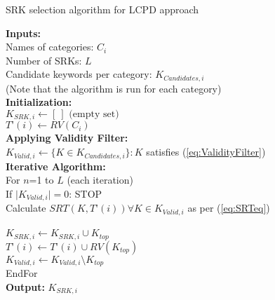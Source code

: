 \begin{algorithm}
\fontsize{8pt}{1em}\selectfont
\caption{SRK selection algorithm for LCPD approach}
\label{SRTAlgorithm}
\textbf{Inputs:} \\ 
\hspace*{2mm} Names of categories: $C_i$ \\
\hspace*{2mm} Number of SRKs: $L$ \\
\hspace*{2mm} Candidate keywords per category: $K_{Candidates, i}$\\
\hspace*{2mm}   (Note that the algorithm is run for each category) \\ 
\textbf{Initialization:} \\ 
\hspace*{2mm} $K_{SRK, i} \leftarrow  [ \ ] \text{~(empty set)}$ \\
\hspace*{2mm} $T\text{'}(i) \leftarrow  RV(C_i)$ \\
\textbf{Applying Validity Filter:} \\
\hspace*{2mm} $K_{Valid,i} \leftarrow \{K \in K_{Candidates, i} \}: K$ satisfies (\ref{eq:ValidityFilter}) \\
\textbf{Iterative Algorithm:} \\
\hspace*{2mm} For $n$=1 to $L$ (each iteration) \\
\hspace*{6mm}  If $\mid K_{Valid, i}\mid=0$: STOP \\ 
\hspace*{6mm}  Calculate $SRT(K,T\text{'}(i)) \forall K \in K_{Valid, i}$ as per (\ref{eq:SRTeq})  \\
\hspace*{6mm}   \\
\hspace*{6mm}  $K_{SRK, i} \leftarrow K_{SRK, i} \cup K_{top}$ \\ 
\hspace*{6mm}  $T\text{'}(i) \leftarrow  T\text{'}(i) \cup RV(K_{top})$ \\
\hspace*{6mm}  $K_{Valid, i} \leftarrow K_{Valid, i} \setminus K_{top}$ \\
\hspace*{2mm} EndFor \\ 
\textbf{Output:} $K_{SRK, i}$
\end{algorithm}

